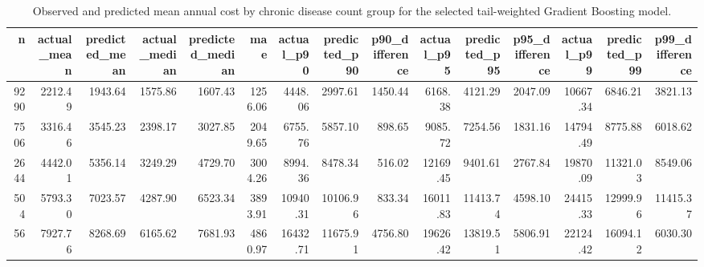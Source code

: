 \begin{table}
\caption{Observed and predicted mean annual cost by chronic disease count group for the selected tail-weighted Gradient Boosting model.}
\label{tab:06-selected-mean-group-summary-chronic-count}
\begin{tabular}{rrrrrrrrrrrrrrr}
\toprule
n & actual_mean & predicted_mean & actual_median & predicted_median & mae & actual_p90 & predicted_p90 & p90_difference & actual_p95 & predicted_p95 & p95_difference & actual_p99 & predicted_p99 & p99_difference \\
\midrule
9290 & 2212.49 & 1943.64 & 1575.86 & 1607.43 & 1256.06 & 4448.06 & 2997.61 & 1450.44 & 6168.38 & 4121.29 & 2047.09 & 10667.34 & 6846.21 & 3821.13 \\
7506 & 3316.46 & 3545.23 & 2398.17 & 3027.85 & 2049.65 & 6755.76 & 5857.10 & 898.65 & 9085.72 & 7254.56 & 1831.16 & 14794.49 & 8775.88 & 6018.62 \\
2644 & 4442.01 & 5356.14 & 3249.29 & 4729.70 & 3004.26 & 8994.36 & 8478.34 & 516.02 & 12169.45 & 9401.61 & 2767.84 & 19870.09 & 11321.03 & 8549.06 \\
504 & 5793.30 & 7023.57 & 4287.90 & 6523.34 & 3893.91 & 10940.31 & 10106.96 & 833.34 & 16011.83 & 11413.74 & 4598.10 & 24415.33 & 12999.96 & 11415.37 \\
56 & 7927.76 & 8268.69 & 6165.62 & 7681.93 & 4860.97 & 16432.71 & 11675.91 & 4756.80 & 19626.42 & 13819.51 & 5806.91 & 22124.42 & 16094.12 & 6030.30 \\
\bottomrule
\end{tabular}
\end{table}

